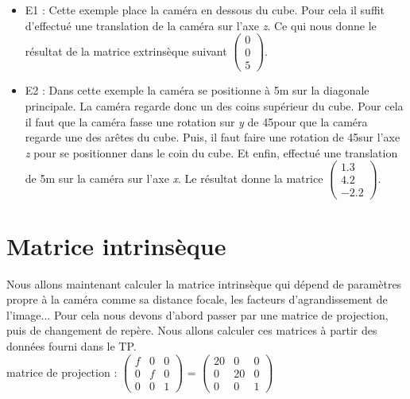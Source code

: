\documentclass[a4paper,11pt]{article}
\begin{document}
  \begin{itemize}
   \item E1 : Cette exemple place la caméra en dessous du cube. Pour cela il suffit
   d'effectué une translation de la caméra sur l'axe \textit{z}. 
   Ce qui nous donne le résultat de la matrice extrinsèque suivant 
    $\begin{pmatrix}
      0\\
      0\\
      5
      \end{pmatrix}$.
   \item E2 : Dans cette exemple la caméra se positionne à 5m sur la diagonale principale.
   La caméra regarde donc un des coins supérieur du cube. Pour cela il faut que la caméra 
   fasse une rotation sur \textit{y} de 45\degre pour que la caméra regarde une des arêtes du cube. Puis,
   il faut faire une rotation de 45\degre sur l'axe \textit{z} pour se positionner dans le coin du cube. 
   Et enfin, effectué une translation de 5m sur la caméra sur l'axe \textit{x}. Le résultat donne la matrice
   $\begin{pmatrix}
      1.3\\
      4.2\\
      -2.2 
      \end{pmatrix}$.
  \end{itemize}
  
  
  \section{Matrice intrinsèque}
  
  Nous allons maintenant calculer la matrice intrinsèque qui dépend de paramètres propre à la caméra comme
  sa distance focale, les facteurs d'agrandissement de l'image... Pour cela nous devons d'abord passer par
  une matrice de projection, puis de changement de repère. Nous allons calculer ces matrices à partir des 
  données fourni dans le TP.\\
  
  matrice de projection : 
   $\begin{pmatrix}
     f & 0 & 0\\  
     0 & f & 0\\  
     0 & 0 & 1 
     \end{pmatrix}$ = 
   $\begin{pmatrix}
     20 & 0 & 0\\  
     0 & 20 & 0\\  
     0 & 0 & 1 
     \end{pmatrix}$\\
     
\end{document}
